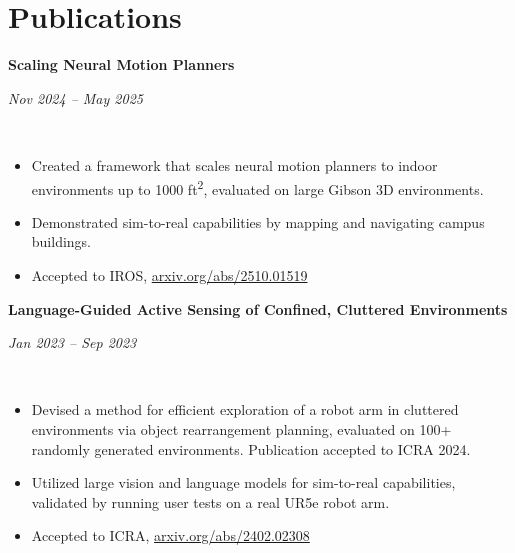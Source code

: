 \documentclass[10pt,letterpaper]{article}
\newcommand{\resumeProject}[2]{%
  \begin{minipage}[t]{0.78\textwidth}\raggedright\textbf{#1}\end{minipage}\hfill
  \begin{minipage}[t]{0.19\textwidth}\raggedleft\textit{#2}\end{minipage}\\[-6pt]
}
\newcommand{\resumeGap}{\vspace{5pt}}
\begin{document}
\section{Publications}
\resumeGap
\resumeProject{Scaling Neural Motion Planners}{Nov 2024 -- May 2025}
\begin{itemize}
    \item Created a framework that scales neural motion planners to indoor environments up to 1000 ft\textsuperscript{2}, evaluated on large Gibson 3D environments.
    \item Demonstrated sim-to-real capabilities by mapping and navigating campus buildings.
    \item Accepted to IROS, \href{https://arxiv.org/abs/2510.01519}{arxiv.org/abs/2510.01519}
\end{itemize}
\resumeGap
\resumeProject{Language-Guided Active Sensing of Confined, Cluttered Environments}{Jan 2023 -- Sep 2023}
\begin{itemize}
    \item Devised a method for efficient exploration of a robot arm in cluttered environments via object rearrangement planning, evaluated on 100+ randomly generated environments. Publication accepted to ICRA 2024.
    \item Utilized large vision and language models for sim-to-real capabilities, validated by running user tests on a real UR5e robot arm.
    \item Accepted to ICRA, \href{https://arxiv.org/abs/2402.02308}{arxiv.org/abs/2402.02308}
\end{itemize}
\resumeGap
\end{document}
